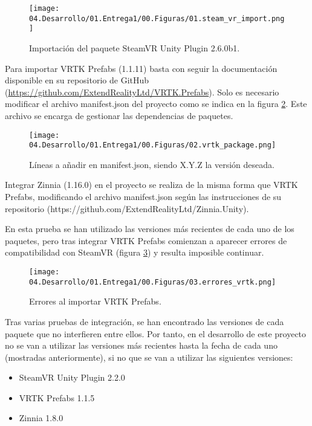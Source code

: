 \begin{figure}
  \centering
    \texttt{[image: 04.Desarrollo/01.Entrega1/00.Figuras/01.steam\_vr\_import.png]}
    \caption{Importación del paquete SteamVR Unity Plugin 2.6.0b1.}
    \label{fig:SteamVRimport}
\end{figure}


Para importar VRTK Prefabs (1.1.11) basta con seguir la documentación disponible en su repositorio de GitHub (\url{https://github.com/ExtendRealityLtd/VRTK.Prefabs}). Solo es necesario modificar el archivo manifest.json del proyecto como se indica en la figura \ref{fig:vrtkPackage}. Este archivo se encarga de gestionar las dependencias de paquetes.

\begin{figure}
  \centering
    \texttt{[image: 04.Desarrollo/01.Entrega1/00.Figuras/02.vrtk\_package.png]}
    \caption{Líneas a añadir en manifest.json, siendo X.Y.Z la versión deseada.}
    \label{fig:vrtkPackage}
\end{figure}

Integrar Zinnia (1.16.0) en el proyecto se realiza de la misma forma que VRTK Prefabs, modificando el archivo manifest.json según las instrucciones de su repositorio (https://github.com/ExtendRealityLtd/Zinnia.Unity).

En esta prueba se han utilizado las versiones más recientes de cada uno de los paquetes, pero tras integrar VRTK Prefabs comienzan a aparecer errores de compatibilidad con SteamVR (figura \ref{fig:erroresVrtk}) y resulta imposible continuar.

\begin{figure}
  \centering
    \texttt{[image: 04.Desarrollo/01.Entrega1/00.Figuras/03.errores\_vrtk.png]}
    \caption{Errores al importar VRTK Prefabs.}
    \label{fig:erroresVrtk}
\end{figure}

Tras varias pruebas de integración, se han encontrado las versiones de cada paquete que no interfieren entre ellos. Por tanto, en el desarrollo de este proyecto no se van a utilizar las versiones más recientes hasta la fecha de cada uno (mostradas anteriormente), si no que se van a utilizar las siguientes versiones:


\begin{itemize}
	\item{SteamVR Unity Plugin 2.2.0}

	\item{VRTK Prefabs 1.1.5}
	
	\item{Zinnia 1.8.0}

\end{itemize}


